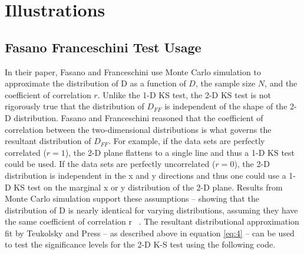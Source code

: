 \documentclass[codesnippet]{jss}
\begin{document}


\section{Illustrations} \label{sec:illustrations}

\subsection{Fasano Franceschini Test Usage}

In their paper, Fasano and Franceschini use Monte Carlo simulation to approximate the distribution of D as a function of $D$, the sample size $N$, and the coefficient of correlation $r$. Unlike the 1-D KS test, the 2-D KS test is not rigorously true that the distribution of $D_{FF}$ is independent of the shape of the 2-D distribution. Fasano and Franceschini reasoned that the coefficient of correlation between the two-dimensional distributions is what governs the resultant distribution of $D_{FF}$. For example, if the data sets are perfectly correlated ($r = 1$), the 2-D plane flattens to a single line and thus a 1-D KS test could be used. If the data sets are perfectly uncorrelated ($r = 0$), the 2-D distribution is independent in the x and y directions and thus one could use a 1-D KS test on the marginal x or y distribution of the 2-D plane.
Results from Monte Carlo simulation support these assumptions -- showing that the distribution of D is nearly identical for varying distributions, assuming they have the same coefficient of correlation r ~\citep{Fasano1987}. The resultant distributional approximation fit by Teukolsky and Press -- as described above in equation \ref{eq:4} -- can be used to test the significance levels for the 2-D K-S test using the following code.
\end{document}
